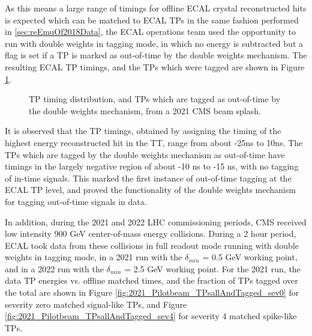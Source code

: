 As this means a large range of timings for offline ECAL crystal reconstructed hits is expected which can be matched to ECAL TPs in the same fashion performed in \ref{sec:reEmuOf2018Data}, the ECAL operations team used the opportunity to run with double weights in tagging mode, in which no energy is subtracted but a flag is set if a TP is marked as out-of-time by the double weights mechanism. The resulting ECAL TP timings, and the TPs which were tagged are shown in Figure \ref{fig:2021_BeamSplash_DWTagging}. 

\begin{figure}[H]%
    \setcounter{subfigure}{0}
    \centering
    \caption{TP timing distribution, and TPs which are tagged as out-of-time by the double weights mechanism, from a 2021 CMS beam splash. \label{fig:2021_BeamSplash_DWTagging}}%
\end{figure}  

It is observed that the TP timings, obtained by assigning the timing of the highest energy reconstructed hit in the TT, range from about -25ns to 10ns. The TPs which are tagged by the double weights mechanism as out-of-time have timings in the largely negative region of about -10 ns to -15 ns, with no tagging of in-time signals. This marked the first instance of out-of-time tagging at the ECAL TP level, and proved the functionality of the double weights mechanism for tagging out-of-time signals in data.

In addition, during the 2021 and 2022 LHC commissioning periods, CMS received low intensity 900 GeV center-of-mass energy collisions. During a 2 hour period, ECAL took data from these collisions in full readout mode running with double weights in tagging mode, in a 2021 run with the $\delta_{min}$ = 0.5 GeV working point, and in a 2022 run with the $\delta_{min}$ = 2.5 GeV working point. For the 2021 run, the data TP energies vs. offline matched times, and the fraction of TPs tagged over the total are shown in Figure \ref{fig:2021_Pilotbeam_TPsallAndTagged_sev0} for severity zero matched signal-like TPs, and Figure \ref{fig:2021_Pilotbeam_TPsallAndTagged_sev4} for severity 4 matched spike-like TPs. 

